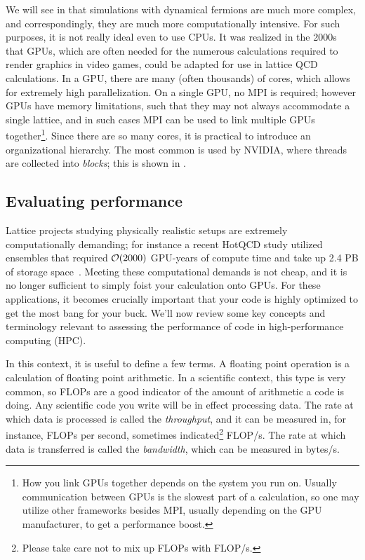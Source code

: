 We will see in  that simulations with dynamical fermions
are much more complex, and correspondingly, they are much more
computationally intensive. For such purposes, it is not really ideal even
to use CPUs. It was realized in the 2000s~\cite{egri_lattice_2007}
that GPUs, which
are often needed for the numerous calculations required to render graphics
in video games, could be adapted for use in lattice QCD calculations.
In a GPU, there are many (often thousands) of cores, which allows for
extremely high parallelization. On a single GPU, no MPI is required;
however GPUs have memory limitations, such that they may not always accommodate
a single lattice, and in such cases MPI can be used to link
multiple GPUs together\footnote{How you link GPUs together depends on the
system you run on. Usually communication between GPUs is the slowest part
of a calculation, so one may utilize other frameworks besides MPI, usually
depending on the GPU manufacturer, to get a performance boost.}.
Since there are so many cores, it is practical to introduce an organizational
hierarchy. The most common is used by NVIDIA, where threads are collected
into {\it blocks}; this is shown in .

\subsection{Evaluating performance}

Lattice projects studying physically realistic setups
 are extremely computationally demanding; for instance
a recent HotQCD study utilized ensembles that required
$\order{2000}$ GPU-years of compute time and take up 2.4 PB of storage 
space~\cite{Bollweg:2021vqf}. Meeting these computational demands is
not cheap, and it is no longer sufficient to simply foist your
calculation onto GPUs. For these applications, it becomes crucially 
important that your code is highly
optimized to get the most bang for your buck.
We'll now review some key concepts and terminology
relevant to assessing the performance of code
in high-performance computing (HPC). 

In this context, it is useful to define a few terms. A floating
point operation is a calculation of floating point arithmetic. In a
scientific context, this type is very common, so FLOPs are a good indicator
of the amount of arithmetic a code is doing. Any scientific code you write will
be in effect processing data. The rate at which data is processed
is called the {\it throughput}, 
and it can be measured in, for instance, FLOPs
per second, sometimes indicated\footnote{Please take care not to
mix up FLOPs with FLOP/s.} FLOP/s. The rate at which data is
transferred is called the {\it bandwidth},
which can be measured in bytes/s.

